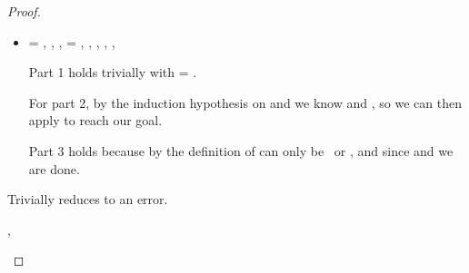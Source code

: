 \begin{lemma}
\begin{proof}
\begin{case}[B-IsA]
  \begin{itemize}
    \item[]
      \begin{subcase}[T-IsA]
  \ep{} = { {}},
  \judgementrewrite {\propenv{}} {} {}
             {
                         {}}
                       {}
                       {},
  \judgementrewrite {\propenv{}} {} {}
             {
                         {}}
                       {}
                       {},
  \e{} = { {}},
  \issubtypein{}{\Boolean}{\ty{}},
  ,
  \inpropenv{\thenprop {\propp{}}}{\thenprop {\prop{}}},
  \inpropenv{\elseprop {\propp{}}}{\elseprop {\prop{}}},
  \issubobjin{}{\emptyobject{}}{\object{}}

        Part 1 holds trivially with \object{} = \emptyobject{}.

        For part 2, by the induction hypothesis on  and 
        we know
  \judgementrewrite {\propenv{}} {} {}
             {
                         {}}
                       {}
                       {} and
  \judgementrewrite {\propenv{}} {} {}
             {
                         {}}
                       {}
                       {},
                       so we can then apply
        to reach our goal.

        Part 3 holds because by the definition of \isaopsemliteral
        \val{} can only be \true\ or \false, 
        and since \judgementtwo{\propenv{}}{\true}{\ty{}}
        and
        \judgementtwo{\propenv{}}{\false}{\ty{}}
        we are done.
      \end{subcase}
  \end{itemize}
\end{case}

      \begin{case}[BE-IsA1]
        \opsem {\openv{}} {} {\errorvalv{}}

        Trivially reduces to an error.
      \end{case}
      \begin{case}[BE-IsA2]
       \opsem {\openv{}} {} {},
       \opsem {\openv{}} {} {\errorvalv{}}


\end{case}
\end{proof}
\end{lemma}
